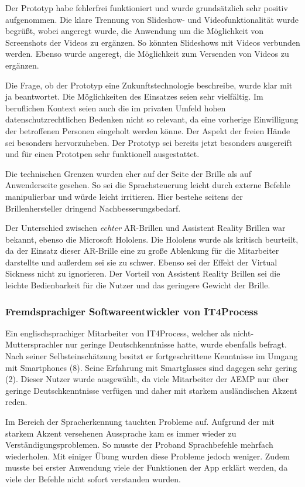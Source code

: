 Der Prototyp habe fehlerfrei funktioniert und wurde grundsätzlich sehr positiv aufgenommen. Die klare Trennung von Slideshow- und Videofunktionalität wurde begrüßt, wobei angeregt wurde, die Anwendung um die Möglichkeit von Screenshots der Videos zu ergänzen. So könnten Slideshows mit Videos verbunden werden. Ebenso wurde angeregt, die Möglichkeit zum Versenden von Videos zu ergänzen.

Die Frage, ob der Prototyp eine Zukunftstechnologie beschreibe, wurde klar mit ja beantwortet. Die Möglichkeiten des Einsatzes seien sehr vielfältig. Im beruflichen Kontext seien auch die im privaten Umfeld hohen datenschutzrechtlichen Bedenken nicht so relevant, da eine vorherige Einwilligung der betroffenen Personen eingeholt werden könne. Der Aspekt der freien Hände sei besonders hervorzuheben. Der Prototyp sei bereits jetzt besonders ausgereift und für einen Prototpen sehr funktionell ausgestattet.

Die technischen Grenzen wurden eher auf der Seite der Brille als auf Anwenderseite gesehen. So sei die Sprachsteuerung leicht durch externe Befehle manipulierbar und würde leicht irritieren. Hier bestehe seitens der Brillenhersteller dringend Nachbesserungsbedarf. 

Der Unterschied zwischen \emph{echter} AR-Brillen und Assistent Reality Brillen war bekannt, ebenso die Microsoft Hololens. Die Hololens wurde als kritisch beurteilt, da der Einsatz dieser AR-Brille eine zu große Ablenkung für die Mitarbeiter darstellte und außerdem sei sie zu schwer. Ebenso sei der Effekt der Virtual Sickness nicht zu ignorieren. Der Vorteil von Assistent Reality Brillen sei die leichte Bedienbarkeit für die Nutzer und das geringere Gewicht der Brille.
%
%
\subsubsection{Fremdsprachiger Softwareentwickler von IT4Process}
%
Ein englischsprachiger Mitarbeiter von IT4Process, welcher als nicht-Muttersprachler nur geringe Deutschkenntnisse hatte, wurde ebenfalls befragt. Nach seiner Selbsteinschätzung besitzt er fortgeschrittene Kenntnisse im Umgang mit Smartphones (8). Seine Erfahrung mit Smartglasses sind dagegen sehr gering (2). Dieser Nutzer wurde ausgewählt, da viele Mitarbeiter der AEMP nur über geringe Deutschkenntnisse verfügen und daher mit starkem ausländischen Akzent reden.

Im Bereich der Spracherkennung tauchten Probleme auf. Aufgrund der mit starkem Akzent versehenen Aussprache kam es immer wieder zu Verständigungsproblemen. So musste der Proband Sprachbefehle mehrfach wiederholen. Mit einiger Übung wurden diese Probleme jedoch weniger. Zudem musste bei erster Anwendung viele der Funktionen der App erklärt werden, da viele der Befehle nicht sofort verstanden wurden.

